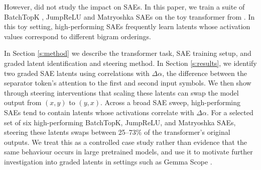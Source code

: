 

However, \citet{farrell2025order} did not study the impact on SAEs.
In this paper, we train a suite of BatchTopK \cite{bussmann2024batchtopk}, JumpReLU \cite{rajamanoharan2024jumping} and Matryoshka \cite{bussmann2025learning} SAEs on the toy transformer from \citet{farrell2025order}. In this toy setting, high-performing SAEs frequently learn latents whose activation values correspond to different bigram orderings.

In Section \ref{s:method} we describe the transformer task, SAE training setup, and graded latent identification and steering method.
In Section \ref{s:results}, we identify two graded SAE latents using correlations with $\Delta \alpha$, the difference between the separator token's attention to the first and second input symbols. We then show through steering interventions that scaling these latents can swap the model output from $(x,y)$ to $(y,x)$.
Across a broad SAE sweep, high-performing SAEs tend to contain latents whose activations correlate with $\Delta \alpha$. For a selected set of six high-performing BatchTopK, JumpReLU, and Matryoshka SAEs, steering these latents swaps between 25--73\% of the transformer's original outputs. We treat this as a controlled case study rather than evidence that the same behaviour occurs in large pretrained models, and use it to motivate further investigation into graded latents in settings such as Gemma Scope \citep{lieberum2024gemma, mcdougall2025gemmascope2}.
